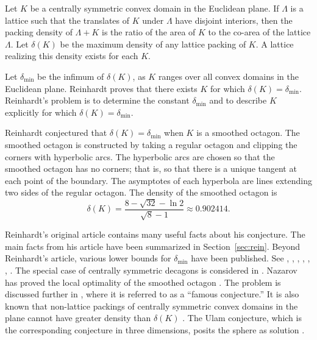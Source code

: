\documentclass[11pt]{amsart}
\def\deltalat{\mathbb\delta}  %
\def\delt{\delta_{\min}}
\begin{document}
Let $K$ be a centrally symmetric convex domain in the Euclidean plane.
If $\Lambda$ is a lattice such that the translates of $K$ under
$\Lambda$ have disjoint interiors, then the packing density of
$\Lambda+K$ is the ratio of the area of $K$ to the co-area of the
lattice $\Lambda$.  Let $\deltalat(K)$ be the maximum density of any
lattice packing of $K$.  A lattice realizing this density exists for
each $K$.

Let $\delt$ be the infimum of $\deltalat(K)$, as $K$ ranges over all
convex domains in the Euclidean plane.  Reinhardt proves that there
exists $K$ for which $\deltalat(K)=\delt$.  Reinhardt's problem is to
determine the constant $\delt$ and to describe $K$ explicitly for
which $\deltalat(K)=\delt$.

Reinhardt conjectured that $\deltalat(K) =\delt$ when $K$ is a
smoothed octagon.  The smoothed octagon is constructed by taking a
regular octagon and clipping the corners with hyperbolic arcs.  The
hyperbolic arcs are chosen so that the smoothed octagon has no
corners; that is, so that there is a unique tangent at each point of
the boundary.  The asymptotes of each hyperbola are lines extending
two sides of the regular octagon.  The density of the smoothed octagon
is
\[\deltalat(K) = \frac{8 - \sqrt{32} - \ln{2}}{\sqrt8 - 1}\approx 0.902414.\]

Reinhardt's original article contains many useful facts about his
conjecture.  The main facts from his article have been summarized in
Section~\ref{sec:rein}.  Beyond Reinhardt's article, various lower
bounds for $\delt$ have been published.  
See \cite{Juhasz:1983}, 
\cite{Mahler:1946}, \cite{Mahler:47a}, \cite{Mahler:47b}, \cite{Toth:1972:Lagerungen}, \cite{Tammela:1970},
\cite{Ennola-1961}.  The special case of centrally symmetric decagons is
considered in \cite{Ledermann:1949}.  Nazarov has proved the local optimality of
the smoothed octagon \cite{Nazarov}. The problem is discussed further in
\cite{Pach:1995}, where it is referred to as a ``famous conjecture.''  It is
also known that non-lattice packings of centrally symmetric convex
domains in the plane cannot have greater density than $\deltalat(K)$
\cite{Fejes-Toth:50}.  The Ulam conjecture, which is the corresponding
conjecture in three dimensions, posits the sphere as solution
\cite{Gardner:2001}.
\end{document}
